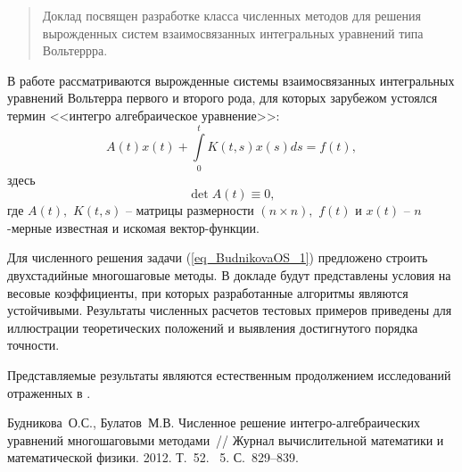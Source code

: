 
\maketitle

\begin{abstract}
Доклад посвящен разработке класса численных методов для решения вырожденных систем взаимосвязанных интегральных уравнений типа Вольтеррра.

\end{abstract}


В работе рассматриваются вырожденные системы взаимосвязанных интегральных уравнений Вольтерра первого и второго рода, для которых зарубежом устоялся термин <<интегро алгебраическое уравнение>>:
\begin{equation}
\label{eq_BudnikovaOS_1}
A(t)x(t)+\int\limits^{t}_{0}{K(t,s)x(s)ds}=f(t),
\end{equation}
здесь
\begin{equation*}
\det A(t) \equiv 0,
\end{equation*}
где $A(t),$ $K(t,s)$ -- матрицы размерности $(n \times n),$ $f(t)$ и $x(t)$ -- $n$-мерные известная и искомая вектор-функции.

Для численного решения задачи (\ref{eq_BudnikovaOS_1}) предложено строить двухстадийные многошаговые методы.  В докладе будут представлены условия на весовые коэффициенты, при которых разработанные алгоритмы являются устойчивыми. Результаты численных расчетов тестовых примеров приведены для иллюстрации теоретических положений и выявления достигнутого порядка точности.

Представляемые результаты являются естественным продолжением исследований отраженных в \cite{ct_BudnikovaOS_1}.



\begin{thebibliography}{9} %
 Будникова~О.С., Булатов~М.В. Численное решение интегро-алгебраических уравнений многошаговыми методами~// Журнал вычислительной математики и математической физики. 2012. Т.~52. \textnumero~5. С.~829--839.


\end{thebibliography}




%